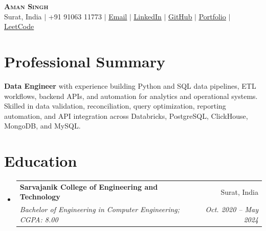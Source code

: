 \documentclass[letterpaper,10pt]{article}
\makeatletter
\newcommand{\resumeSubheading}[4]{
  \vspace{-2pt}\item
  \begin{tabular*}{0.97\textwidth}[t]{l@{\extracolsep{\fill}}r}
    \textbf{#1} & #2 \\
    \textit{\small#3} & \textit{\small #4} \\
  \end{tabular*}\vspace{-7pt}
}
\newcommand{\resumeSubHeadingListStart}{\begin{itemize}[leftmargin=0.15in, label={}]}
\newcommand{\resumeSubHeadingListEnd}{\end{itemize}}
\makeatother
\begin{document}
\begin{center}
  \textbf{\Huge \scshape Aman Singh} \\ \vspace{1pt}
  \small Surat, India $|$ +91 91063 11773 $|$ \href{mailto:amansingh143003@gmail.com}{\underline{Email}} $|$
  \href{https://linkedin.com/in/aman-singh-865780203}{\underline{LinkedIn}} $|$
  \href{https://github.com/Aman-singh143}{\underline{GitHub}} $|$
  \href{https://aman-singh143.github.io/Aman-Portfolio/}{\underline{Portfolio}} $|$
  \href{https://leetcode.com/u/amansingh9}{\underline{LeetCode}}
\end{center}

\section{Professional Summary}
\small{\textbf{Data Engineer} with experience building Python and SQL data pipelines, ETL workflows, backend APIs, and automation for analytics and operational systems. Skilled in data validation, reconciliation, query optimization, reporting automation, and API integration across Databricks, PostgreSQL, ClickHouse, MongoDB, and MySQL.}

\section{Education}
\resumeSubHeadingListStart
  \resumeSubheading
    {Sarvajanik College of Engineering and Technology}{Surat, India}
    {Bachelor of Engineering in Computer Engineering; CGPA: 8.00}{Oct. 2020 -- May 2024}
\resumeSubHeadingListEnd
\end{document}
